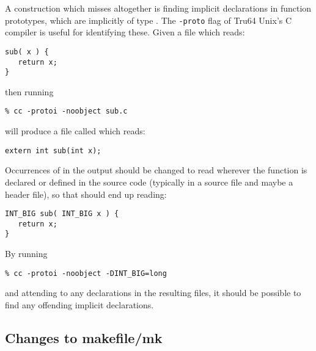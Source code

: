 \documentclass[twoside,11pt]{article}
\renewcommand{\_}{\texttt{\symbol{95}}}
\begin{document}
A construction which  misses altogether is finding
implicit declarations in function prototypes, which are implicitly
of type .
The {\tt -proto} flag of Tru64 Unix's C compiler is useful for identifying
these.
Given a file  which reads:
\begin{squote}
\begin{verbatim}
sub( x ) {
   return x;
}
\end{verbatim}
\end{squote}
then running
\begin{squote}
\begin{verbatim}
% cc -protoi -noobject sub.c
\end{verbatim}
\end{squote}
will produce a file called  which reads:
\begin{squote}
\begin{verbatim}
extern int sub(int x);
\end{verbatim}
\end{squote}
Occurrences of  in the output  should be 
changed to read \cc{INT\_BIG} wherever the function is declared or
defined in the source code (typically in a source file and maybe a 
header file), so that  should
end up reading:
\begin{squote}
\begin{verbatim}
INT_BIG sub( INT_BIG x ) {
   return x;
}
\end{verbatim}
\end{squote}
By running
\begin{squote}
\begin{verbatim}
% cc -protoi -noobject -DINT_BIG=long
\end{verbatim}
\end{squote}
and attending to any  declarations in the resulting  files,
it should be possible to find any offending implicit declarations.


\subsection{Changes to makefile/mk\label{sec:makefile}}
\end{document}
